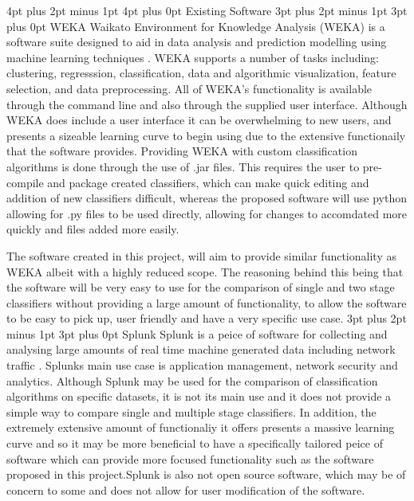 \documentclass[12pt,a4paper]{article}
\makeatletter
\renewcommand\subsection{\@startsection {subsection}{1}{2mm} %
      {3pt plus 2pt minus 1pt} %
      {3pt plus 0pt} %
      {\normalfont\bfseries}}
\renewcommand\section{\@startsection {section}{1}{0mm} %
      {4pt plus 2pt minus 1pt} %
      {4pt plus 0pt} %
      {\bfseries}}
\makeatother
\begin{document}


\newpage
\section{Existing Software}
\subsection{WEKA}
Waikato Environment for Knowledge Analysis (WEKA) is a software suite designed to aid in data analysis and prediction modelling using machine learning techniques \cite{hall2009weka}. WEKA supports a number of tasks including: clustering, regresssion, classification, data and algorithmic visualization, feature selection, and data preprocessing. All of WEKA's functionality is available through the command line and also through the supplied user interface. Although WEKA does include a user interface it can be overwhelming to new users, and presents a sizeable learning curve to begin using due to the extensive functionaily that the software provides. Providing WEKA with custom classification algorithms is done through the use of .jar files. This requires the user to pre-compile and package created classifiers, which can make quick editing and addition of new classifiers difficult, whereas the proposed software will use python allowing for .py files to be used directly, allowing for changes to accomdated more quickly and files added more easily.

	The software created in this project, will aim to provide similar functionality as WEKA albeit with a highly reduced scope. The reasoning behind this being that the software will be very easy to use for the comparison of single and two stage classifiers without providing a large amount of functionality, to allow the software to be easy to pick up, user friendly and have a very specific use case.
\subsection{Splunk}
Splunk is a peice of software for collecting and analysing large amounts of real time machine generated data including network traffic \parencite{splunk}. Splunks main use case is application management, network security and analytics. Although Splunk may be used for the comparison of classification algorithms on specific datasets, it is not its main use and it does not provide a simple way to compare single and multiple stage classifiers. In addition, the extremely extensive amount of functionaliy it offers presents a massive learning curve and so it may be more beneficial to have a specifically tailored peice of software which can provide more focused functionality such as the software proposed in this project.Splunk is also not open source software, which may be of concern to some and does not allow for user modification of the software.
\newpage
\end{document}
